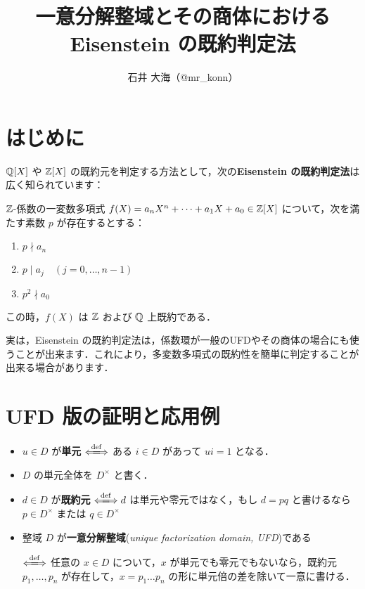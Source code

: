 \documentclass[a4j]{jsarticle}
\title{一意分解整域とその商体における Eisenstein の既約判定法}
\author{石井 大海（@mr\_konn）}
\newcommand{\divs}{ \mid }
\begin{document}
\maketitle

\section{はじめに}
$\mathbb{Q}[X]$ や $\mathbb{Z}[X]$ の既約元を判定する方法として，次の{\bfseries Eisenstein の既約判定法}は広く知られています：

\begin{theorem}
 $\mathbb{Z}$-係数の一変数多項式 $f(X) = a_n X^n + \dots + a_1 X + a_0 \in \mathbb{Z}[X]$ について，次を満たす素数 $p$ が存在するとする：

 \begin{enumerate}[label=(\arabic*)]
  \item $p \nmid a_n$
  \item $p \divs a_j \quad (j = 0, \dots, n-1)$
  \item $p^2 \nmid a_0$
 \end{enumerate}

 この時，$f(X)$ は $\mathbb{Z}$ および $\mathbb{Q}$ 上既約である．
\end{theorem}

実は，Eisenstein の既約判定法は，係数環が一般のUFDやその商体の場合にも使うことが出来ます．これにより，多変数多項式の既約性を簡単に判定することが出来る場合があります．

\section{UFD 版の証明と応用例}

\begin{definition}
 \begin{itemize}
  \item $u \in D$ が{\bfseries 単元} $\defs$ ある $i \in D$ があって $ui = 1$ となる．
  \item $D$ の単元全体を $D^\times$ と書く．
  \item $d \in D$ が{\bfseries 既約元} $\defs d $ は単元や零元ではなく，もし $d = pq$ と書けるなら $p \in D^\times$ または $q \in D^\times$
  \item 整域 $D$ が{\bfseries 一意分解整域}({\itshape unique factorization domain, UFD})である

  $\defs$ 任意の $x \in D$ について，$x$ が単元でも零元でもないなら，既約元 $p_1, \dots, p_n$ が存在して，$x = p_1 \dots p_n$ の形に単元倍の差を除いて一意に書ける．
 \end{itemize}
\end{definition}
\end{document}

